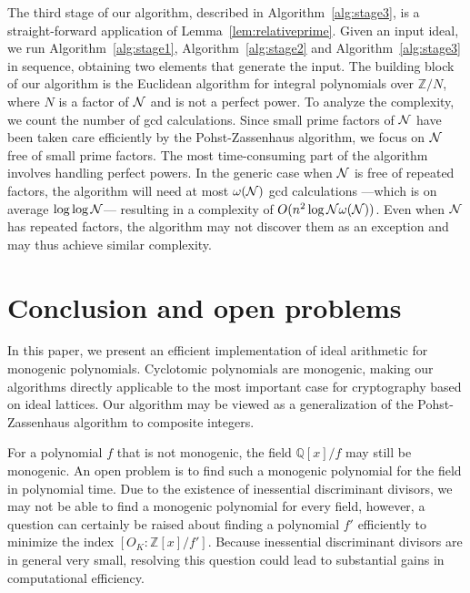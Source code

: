 \documentclass[runningheads, letter]{llncs}
\newcommand{\Z}{{\mathbb Z}}
\newcommand{\Q}{{\mathbb Q}}
\begin{document}
The third stage of our algorithm, described in
Algorithm~\ref{alg:stage3}, is a straight-forward
application of Lemma~\ref{lem:relativeprime}.
Given an input ideal, we run Algorithm~\ref{alg:stage1},
Algorithm~\ref{alg:stage2} and Algorithm~\ref{alg:stage3}
in sequence, obtaining two elements that generate
the input.
%
%
The building block of our algorithm is the Euclidean
algorithm for integral polynomials over \( \Z/N \),
where \( N \) is a factor of \( {\cal N} \) and
is not a perfect power. To analyze the complexity, we count
the number of gcd calculations.
Since small prime factors of \( {\cal N} \) have been
taken care efficiently by the Pohst-Zassenhaus algorithm,
we focus on \( {\cal N} \) free of small prime factors.
The most time-consuming part of the algorithm involves
handling perfect powers.
%
In the generic case when \( {\cal N} \) is free of
repeated factors, the algorithm will need
at most \( \omega({\cal N}) \) gcd calculations
---which is on average \( \log\log {\cal N} \)---
resulting in a complexity of
\( O (n^2 \log {\cal N} \omega({\cal N}) )\).
Even when \( {\cal N} \) has repeated factors,
the algorithm may not discover them as an exception
and may thus achieve similar complexity.

\begin{algorithm}[h]\label{alg:stage3}
  \caption{Sketch of the algorithm in the third stage}
      \KwOut{ two elements $M \in \Z$ and $c(x) \in \Z[x]$ }
 \end{algorithm}

 \section{Conclusion and open problems}
In this paper, we present an efficient implementation of
ideal arithmetic for monogenic polynomials.
Cyclotomic polynomials are monogenic,
making our algorithms directly applicable to
the most important case for cryptography based on ideal lattices.
Our algorithm may be viewed as a
generalization of the Pohst-Zassenhaus algorithm
to composite integers.

For a polynomial \( f \) that is not
monogenic, the field \( \Q[x]/f \) may still be
monogenic. An open problem is to find such a monogenic
polynomial for the field in polynomial time.
Due to the existence of inessential
discriminant divisors, we may not be able to find a monogenic
polynomial for every field, however, a question can
certainly be raised about finding a polynomial \( f' \)
efficiently to  minimize the index \( [O_K:\Z[x]/f'] \).
Because inessential discriminant divisors are in general very small, resolving this question could lead to substantial gains in computational efficiency.
\end{document}
